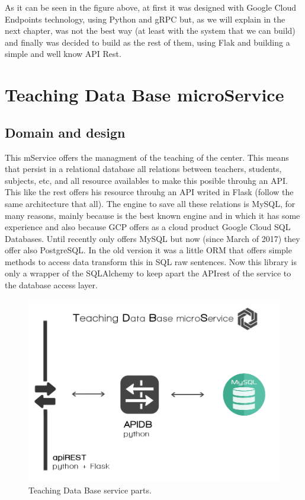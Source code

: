 \noindent As it can be seen in the figure above, at first it was designed with Google Cloud
Endpoints technology, using Python and gRPC but, as we will explain in the next
chapter, was not the best way (at least with the system that we can build) and
finally was decided to build as the rest of them, using Flak and building a
simple and well know API Rest.


\section{Teaching Data Base microService}

\subsection{Domain and design}

This mService offers the managment of the teaching of the center.
This means that persist in a relational database all relations between
teachers, students, subjects, etc, and all resource availables to
make this posible throuhg an API.
\intro
This like the rest offers his resource throuhg an API writed in Flask
(follow the same architecture that all).
\intro
The engine to save all these relations is MySQL, for many reasons,
mainly because is the best known engine and in which it has some experience
and also because GCP offers as a cloud product Google Cloud SQL Databases.
Until recently only offers MySQL but now (since March of 2017) they
offer also PostgreSQL.
\intro
In the old version it was a little ORM that offers simple methods
to access data transform this in SQL raw sentences. Now this library
is only a wrapper of the SQLAlchemy to keep apart the APIrest of the
service to the database access layer.

\begin{figure}[H]
  \includegraphics[scale=0.35]{img/graphics/tdbms.png}
  \centering
  \caption{Teaching Data Base service parts.}
\end{figure}


